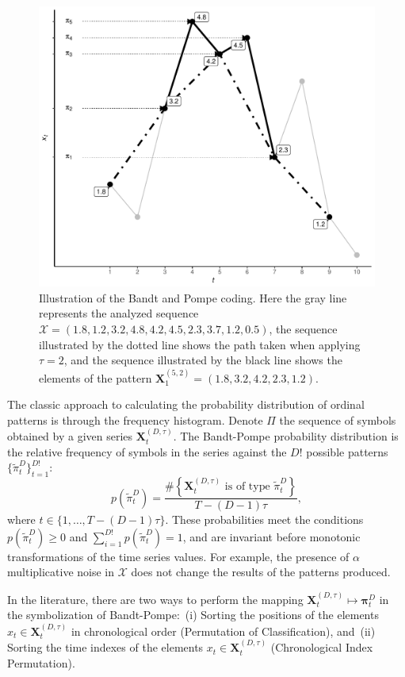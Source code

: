 \begin{figure}
	\centering
	\includegraphics[width=.9\linewidth]{Figures/IntroBP.pdf}
	\caption{Illustration of the Bandt and Pompe coding\label{SAR:Fig:IntroBP}. Here the gray line represents the analyzed sequence $\mathcal X = (1.8, 1.2, 3.2, 4.8, 4.2, 4.5, 2.3, 3.7, 1.2, 0.5)$, the sequence illustrated by the dotted line shows the path taken when applying $\tau = 2$, and the sequence illustrated by the black line shows the elements of the pattern $\mathbf X_{1}^{(5,2)}= (1.8, 3.2, 4.2, 2.3, 1.2)$.}
\end{figure}

The classic approach to calculating the probability distribution of ordinal patterns is through the frequency histogram.
Denote $\Pi$ the sequence of symbols obtained by a given series $\mathbf{X}_t^{(D,\tau)}$.
The Bandt-Pompe probability distribution is the relative frequency of symbols in the series against the $D!$ possible patterns $\{\widetilde\pi_t^D \}_{t = 1}^{D!}$:
\begin{equation}
p(\widetilde\pi_t^D) = \frac{\#\left \{\mathbf{X}_t^{(D,\tau)} \text{ is of type } \widetilde\pi_t^D\right \}}{T- (D-1)\tau},  
\end{equation}
where  $t\in \{1, \dots, T-(D-1)\tau\}$.
These probabilities meet the conditions $p(\widetilde\pi_t^D) \ge 0$ and  $\sum_{i=1}^{D!} p(\widetilde\pi_t^D) = 1$, and are invariant before monotonic transformations of the time series values.
For example, the presence of $\alpha$ multiplicative noise in ${\mathcal X}$ does not change the results of the patterns produced.

In the literature, there are two ways to perform the mapping ${\mathbf X}_t^{(D, \tau)} \mapsto {\mathbf \pi}_t^{D}$ in the symbolization of Bandt-Pompe:~(i) Sorting the positions of the elements $x_t \in {\mathbf X}_t^{(D, \tau)}$ in chronological order (Permutation of Classification), and~(ii) Sorting the time indexes of the elements $x_t \in {\mathbf X}_t^{(D, \tau)}$ (Chronological Index Permutation).


